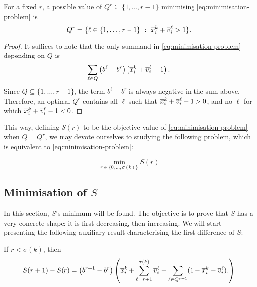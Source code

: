 \begin{lemma}
    For a fixed $r$, a possible value of $Q^r \subseteq \{1, \ldots, r-1\}$
    minimising \eqref{eq:minimisation-problem} is
    \[
        Q^r = \{
            \ell \in \{1, \ldots, r-1\}
            ~:~
            \overline{x}_i^k + \overline{v}_i^\ell > 1
        \}.
    \]
\end{lemma}

\begin{proof}
    It suffices to note that the only summand in \eqref{eq:minimisation-problem}
    depending on $Q$ is
    \[
        \sum_{\ell \in Q} \left(b^\ell - b^r\right)\left(\overline{x}_i^k + \overline{v}_i^\ell - 1\right).
    \]
    Since $Q \subseteq \{1, \ldots, r - 1\}$, the term $b^\ell - b^r$ is always
    negative in the sum above. Therefore, an optimal $Q^r$ contains all $\ell$
    such that
    $
        \overline{x}_i^k + \overline{v}_i^\ell - 1 > 0
    $,
    and no $\ell$ for which
    $
        \overline{x}_i^k + \overline{v}_i^\ell - 1 < 0
    $.
\end{proof}

This way, defining $S(r)$ to be the objective value of
\eqref{eq:minimisation-problem} when $Q = Q^r$, we may devote ourselves to
studying the following problem, which is equivalent to
\eqref{eq:minimisation-problem}:

\begin{equation}
    \min_{r \in \{0, \ldots, \sigma(k)\}} S(r)
    \label{eq:alt-minimisation-problem}
\end{equation}

\subsection{Minimisation of $S$} %
\label{ssc:las:soi:minimisation}

In this section, $S$'s minimum will be found. The objective is to prove that $S$
has a very concrete shape: it is first decreasing, then increasing. We will
start presenting the following auxiliary result characterising the first
difference of $S$:

\begin{lemma}
    If $r < \sigma(k)$, then
    \[
        S(r + 1) - S(r) =
            \left(b^{r + 1} - b^r\right)
            \left(
                \overline{x}_i^k
                + \sum_{\ell = r + 1}^{\sigma(k)} \overline{v}_i^\ell
                + \sum_{\ell \in Q^{r + 1}} (1 - \overline{x}_i^k - \overline{v}_i^\ell).
            \right)
    \]
\end{lemma}

